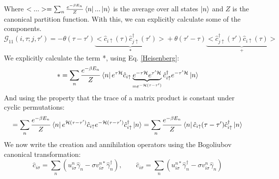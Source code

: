 \documentclass[letterpaper,12pt]{article}
\begin{document}
Where $< ... > = \sum_n \frac{e^{-\beta E_n}}{Z} \bra{n} ... \ket{n}$ is the average over all states $\ket{n}$ and $Z$ is the canonical partition function. With this, we can explicitly calculate some of the components.
\begin{equation}
    \mathcal{G}_{11}(i, \tau; j, \tau') = - \theta(\tau - \tau')\underbrace{<\hat{c}_{i\uparrow}(\tau) \hat{c}_{j\uparrow}^\dagger(\tau')>}_{*} + \theta(\tau' - \tau) \underbrace{<\hat{c}_{j\uparrow}^\dagger(\tau') \hat{c}_{i\uparrow}(\tau)>}_{+}
\end{equation}
We explicitly calculate the term *, using Eq. \ref{Heisenberg}:
\begin{equation*}
    * = \sum_n  \frac{e^{-\beta E_n}}{Z}\bra{n} e^{\tau\mathcal{H}}\hat{c}_{i\uparrow}\underbrace{e^{-\tau\mathcal{H}} e^{\tau'\mathcal{H}}}_{= e^{-\mathcal{H}(\tau - \tau')}}\hat{c}_{i\uparrow}^{\dagger}e^{-\tau'\mathcal{H}} \ket{n}
\end{equation*}
And using the property that the trace of a matrix product is constant under cyclic permutations:
\begin{equation*}
    = \sum_n  \frac{e^{-\beta E_n}}{Z}\bra{n} e^{\mathcal{H}(\tau - \tau')}\hat{c}_{i\uparrow}e^{-\mathcal{H}(\tau - \tau')}\hat{c}_{i\uparrow}^{\dagger} \ket{n} = \sum_n  \frac{e^{-\beta E_n}}{Z}\bra{n} \hat{c}_{i\uparrow} (\tau - \tau')\hat{c}_{i\uparrow}^{\dagger} \ket{n}
\end{equation*}
We now write the creation and annihilation operators using the Bogoliubov canonical transformation:
\begin{equation}
    \hat{c}_{i\sigma} = \sum_n (u_{i\sigma}^n\hat{\gamma}_n - \sigma v_{i\sigma}^{n*}\hat{\gamma}_n^\dagger),
    \qquad
    \hat{c}_{i\sigma} = \sum_n (u_{i\sigma}^{n*}\hat{\gamma}_n^\dagger - \sigma v_{i\sigma}^{n}\hat{\gamma}_n)
\end{equation}
\end{document}
